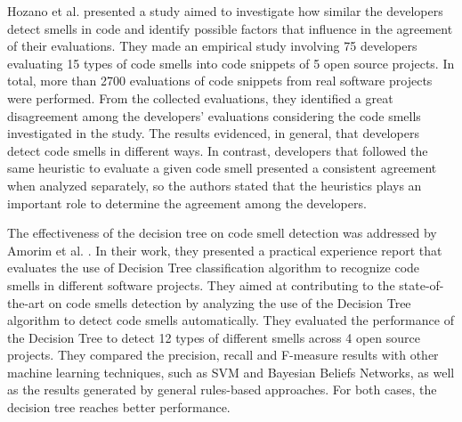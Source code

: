 Hozano et al. \cite{hozano2018you} presented a study aimed to investigate how similar the developers detect smells in code and identify possible factors that influence in the agreement of their evaluations. They made an empirical study involving 75 developers evaluating 15 types of code smells into code snippets of 5 open source projects. In total, more than 2700 evaluations of code snippets from real software projects were performed. From the collected evaluations, they identified a great disagreement among the developers’ evaluations considering the code smells investigated in the study. The results evidenced, in general, that developers detect code smells in different ways. In contrast, developers that followed the same heuristic to evaluate a given code smell presented a consistent agreement when analyzed separately, so the authors stated that the heuristics plays an important role to determine the agreement among the developers.

The effectiveness of the decision tree on code smell detection was addressed by Amorim et al. \cite{amorim2015experience}. In their work, they presented a practical experience report that evaluates the use of Decision Tree classification algorithm to recognize code smells in different software projects. They aimed at contributing to the state-of-the-art on code smells detection by analyzing the use of the Decision Tree algorithm to detect code smells automatically. They evaluated the performance of the Decision Tree to detect 12 types of different smells across 4 open source projects.  They compared the precision, recall and F-measure results with other machine learning techniques, such as SVM and Bayesian Beliefs Networks, as well as the results generated by general rules-based approaches. For both cases, the decision tree reaches better performance. 


